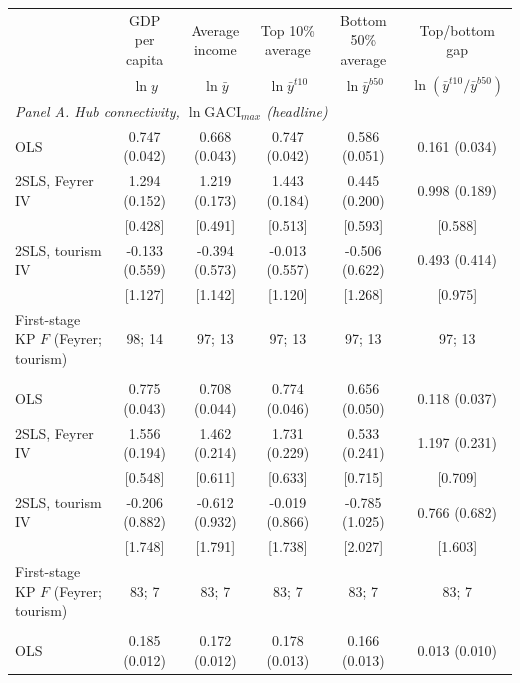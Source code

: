 \begin{tabular}{lccccc}
\toprule
 & GDP per capita & Average income & Top 10\% average & Bottom 50\% average & Top/bottom gap \\
 & $\ln y$ & $\ln \bar{y}$ & $\ln \bar{y}^{t10}$ & $\ln \bar{y}^{b50}$ & $\ln(\bar{y}^{t10}/\bar{y}^{b50})$ \\
\midrule
\multicolumn{6}{l}{\emph{Panel A. Hub connectivity, $\ln\mathrm{GACI}_{max}$ (headline)}}\\
OLS & 0.747\sym{***} (0.042) & 0.668\sym{***} (0.043) & 0.747\sym{***} (0.042) & 0.586\sym{***} (0.051) & 0.161\sym{***} (0.034) \\
2SLS, Feyrer IV & 1.294\sym{***} (0.152) & 1.219\sym{***} (0.173) & 1.443\sym{***} (0.184) & 0.445\sym{**} (0.200) & 0.998\sym{***} (0.189) \\
 & [0.428]\sym{***} & [0.491]\sym{**} & [0.513]\sym{***} & [0.593] & [0.588]\sym{*} \\
2SLS, tourism IV & -0.133 (0.559) & -0.394 (0.573) & -0.013 (0.557) & -0.506 (0.622) & 0.493 (0.414) \\
 & [1.127] & [1.142] & [1.120] & [1.268] & [0.975] \\
First-stage KP $F$ (Feyrer; tourism) & 98; 14 & 97; 13 & 97; 13 & 97; 13 & 97; 13 \\
\addlinespace
\multicolumn{6}{l}{\emph{Panel B. Hub quality, $\ln\mathrm{GACI}_{cwm}$}}\\
OLS & 0.775\sym{***} (0.043) & 0.708\sym{***} (0.044) & 0.774\sym{***} (0.046) & 0.656\sym{***} (0.050) & 0.118\sym{***} (0.037) \\
2SLS, Feyrer IV & 1.556\sym{***} (0.194) & 1.462\sym{***} (0.214) & 1.731\sym{***} (0.229) & 0.533\sym{**} (0.241) & 1.197\sym{***} (0.231) \\
 & [0.548]\sym{***} & [0.611]\sym{**} & [0.633]\sym{***} & [0.715] & [0.709]\sym{*} \\
2SLS, tourism IV & -0.206 (0.882) & -0.612 (0.932) & -0.019 (0.866) & -0.785 (1.025) & 0.766 (0.682) \\
 & [1.748] & [1.791] & [1.738] & [2.027] & [1.603] \\
First-stage KP $F$ (Feyrer; tourism) & 83; 7 & 83; 7 & 83; 7 & 83; 7 & 83; 7 \\
\addlinespace
\multicolumn{6}{l}{\emph{Panel C. Total connectivity, $\ln\mathrm{GACI}_{sum}$}}\\
OLS & 0.185\sym{***} (0.012) & 0.172\sym{***} (0.012) & 0.178\sym{***} (0.013) & 0.166\sym{***} (0.013) & 0.013 (0.010) \\

\end{tabular}
